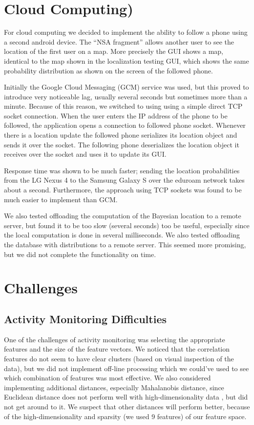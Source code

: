 \documentclass[a4paper,10pt,twoside]{IEEEtran}
\begin{document}
\section{Cloud Computing)}
\label{sec:cloud-computing}

For cloud computing we decided to implement the ability to follow a phone using a second android device.
The ``NSA fragment'' allows another user to see the location of the first user on a map. More precisely the GUI shows a map, identical to the map shown in the localization testing GUI, which shows the same probability distribution as shown on the screen of the followed phone.

Initially the Google Cloud Messaging (GCM) service was used, but this proved to introduce very noticeable lag, usually several seconds but sometimes more than a minute.
Because of this reason, we switched to using using a simple direct TCP socket connection.
When the user enters the IP address of the phone to be followed, the application opens a connection to followed phone socket.
Whenever there is a location update the followed phone serializes its location object and sends it over the socket.
The following phone deserializes the location object it receives over the socket and uses it to update its GUI.

Response time was shown to be much faster; sending the location probabilities from the LG Nexus 4 to the Samsung Galaxy S over the eduroam network takes about a second. Furthermore, the approach using TCP sockets was found to be much easier to implement than GCM.

We also tested offloading the computation of the Bayesian location to a remote server, but found it to be too slow (several seconds) too be useful, especially since the local computation is done in several milliseconds.
We also tested offloading the database with distributions to a remote server.
This seemed more promising, but we did not complete the functionality on time.

\section{Challenges}
\label{sec:innovation}
\subsection{Activity Monitoring Difficulties}
One of the challenges of activity monitoring was selecting the appropriate features and the size of the feature vectors.
We noticed that the correlation features do not seem to have clear clusters (based on visual inspection of the data), but we did not implement off-line processing which we could've used to see which combination of features was most effective.
We also considered implementing additional distances, especially Mahalanobis distance, since Euclidean distance does not perform well with high-dimensionality data \cite{wikipedia1}, but did not get around to it. 
We suspect that other distances will perform better, because of the high-dimensionality and sparsity (we used 9 features) of our feature space.
\end{document}
